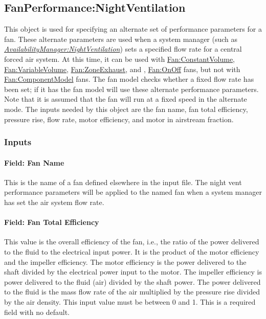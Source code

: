 \subsection{FanPerformance:NightVentilation}\label{fanperformancenightventilation}

This object is used for specifying an alternate set of performance parameters for a fan. These alternate parameters are used when a system manager (such as \emph{\hyperref[availabilitymanagernightventilation]{AvailabilityManager:NightVentilation}}) sets a specified flow rate for a central forced air system. At this time, it can be used with \hyperref[fanconstantvolume]{Fan:ConstantVolume}, \hyperref[fanvariablevolume]{Fan:VariableVolume}, \hyperref[fanzoneexhaust]{Fan:ZoneExhaust}, and , \hyperref[fanonoff]{Fan:OnOff} fans, but not with \hyperref[fancomponentmodel]{Fan:ComponentModel} fans. The fan model checks whether a fixed flow rate has been set; if it has the fan model will use these alternate performance parameters. Note that it is assumed that the fan will run at a fixed speed in the alternate mode. The inputs needed by this object are the fan name, fan total efficiency, pressure rise, flow rate, motor efficiency, and motor in airstream fraction.

\subsubsection{Inputs}\label{inputs-4-013}

\paragraph{Field: Fan Name}\label{field-fan-name-001}

This is the name of a fan defined elsewhere in the input file. The night vent performance parameters will be applied to the named fan when a system manager has set the air system flow rate.

\paragraph{Field: Fan Total Efficiency}\label{field-fan-total-efficiency-4}

This value is the overall efficiency of the fan, i.e., the ratio of the power delivered to the fluid to the electrical input power. It is the product of the motor efficiency and the impeller efficiency. The motor efficiency is the power delivered to the shaft divided by the electrical power input to the motor. The impeller efficiency is power delivered to the fluid (air) divided by the shaft power. The power delivered to the fluid is the mass flow rate of the air multiplied by the pressure rise divided by the air density. This input value must be between 0 and 1. This is a required field with no default.

